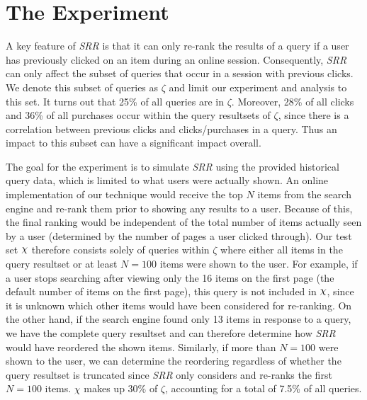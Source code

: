 \documentclass{article}
\def\Chi{\raisebox{2pt}{$\chi$}}
\begin{document}
\section{The Experiment}\label{sec:experiment}
A key feature of {\em SRR} is that it can only re-rank the results of a query if
a user has previously clicked on an item during an online session.
Consequently, {\em SRR} can only affect the subset of queries that occur in a
session with previous clicks. We denote this subset of queries as $\zeta$ and
limit our experiment and analysis to this set. It turns out that 25\% of all
queries are in $\zeta$. Moreover, 28\% of all clicks and 36\% of all purchases
occur within the query resultsets of $\zeta$, since there is a correlation
between previous clicks and clicks/purchases in a query.  Thus an impact to this
subset can have a significant impact overall.

The goal for the experiment is to simulate {\em SRR} using the provided
historical query data, which is limited to what users were actually shown. An
online implementation of our technique would receive the top $N$ items from the
search engine and re-rank them prior to showing any results to a user. Because
of this, the final ranking would be independent of the total number of items
actually seen by a user (determined by the number of pages a user clicked
through).  Our test set $\Chi$ therefore consists solely of queries within
$\zeta$ where either all items in the query resultset or at least $N=100$ items
were shown to the user. For example, if a user stops searching after viewing
only the 16 items on the first page (the default number of items on the first
page), this query is not included in $\Chi$, since it is unknown which other
items would have been considered for re-ranking. On the other hand, if the
search engine found only 13 items in response to a query,  we have the complete
query resultset and can therefore determine how {\em SRR} would have reordered
the shown items. Similarly, if more than $N=100$ were shown to the user, we can
determine the reordering regardless of whether the query resultset is truncated
since {\em SRR} only considers and re-ranks the first $N=100$ items. $\chi$
makes up 30\% of $\zeta$, accounting for a total of 7.5\% of all queries.
\end{document}
